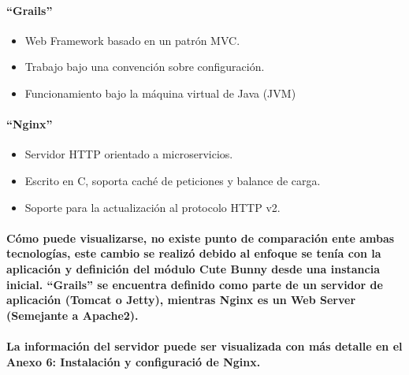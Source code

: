     \paragraph{``Grails''}    
    \begin{itemize}
      \item Web Framework basado en un patrón MVC.
      \item Trabajo bajo una convención sobre configuración.
      \item Funcionamiento bajo la máquina virtual de Java (JVM)
    \end{itemize}
    \paragraph{``Nginx''}    
    \begin{itemize}
      \item Servidor HTTP orientado a microservicios.
      \item Escrito en C, soporta caché de peticiones y balance de carga.
      \item Soporte para la actualización al protocolo HTTP v2.
    \end{itemize}
    \paragraph{Cómo puede visualizarse, no existe punto de comparación ente ambas tecnologías, este cambio se realizó debido al enfoque se tenía con la aplicación y definición del módulo Cute Bunny desde una instancia inicial. ``Grails'' se encuentra definido como parte de un servidor de aplicación (Tomcat o Jetty), mientras Nginx es un Web Server (Semejante a Apache2).}
    \paragraph{La información del servidor puede ser visualizada con más detalle en el Anexo 6: Instalación y configuració de Nginx.}  